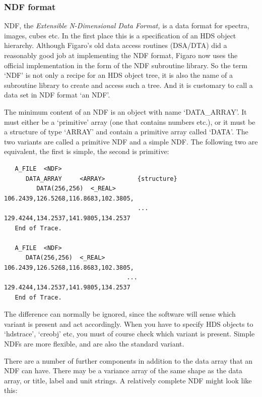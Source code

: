 
\subsubsection{\label{filesndf}NDF format}

   NDF, the
{\em Extensible N-Dimensional Data Format,\/}
   is a data format for spectra, images, cubes etc. In the first place
   this is a specification of an HDS object hierarchy. Although
   Figaro's old data access routines (DSA/DTA) did a reasonably good
   job at implementing the NDF format, Figaro now uses the official
   implementation in the form of the NDF subroutine library.
   So the term `NDF' is not only a recipe for an HDS object tree, it
   is also the name of a subroutine library to create and access such
   a tree. And it is customary to call a data set in NDF format `an
   NDF'.

   The minimum content of an NDF is an object with name
   `DATA\_ARRAY'. It must either be a `primitive' array (one that
   contains numbers etc.), or it must be a structure of type `ARRAY' and
   contain a primitive array called `DATA'. The two variants are
   called a primitive NDF and a simple NDF. The following two are
   equivalent, the first is simple, the second is primitive:

\begin{verbatim}
   A_FILE  <NDF>
      DATA_ARRAY     <ARRAY>         {structure}
         DATA(256,256)  <_REAL>         106.2439,126.5268,116.8683,102.3805,
                                     ... 129.4244,134.2537,141.9805,134.2537
   End of Trace.

   A_FILE  <NDF>
      DATA(256,256)  <_REAL>         106.2439,126.5268,116.8683,102.3805,
                                  ... 129.4244,134.2537,141.9805,134.2537
   End of Trace.
\end{verbatim}

   The difference can normally be ignored, since the software will sense
   which variant is present and act accordingly.  When you have to
   specify HDS objects to `hdstrace', `creobj' etc, you must of course
   check which variant is present.  Simple NDFs are more flexible, and
   are also the standard variant.

   There are a number of further components in addition to the data
   array that an NDF can have. There may be a variance array of the same
   shape as the data array, or title, label and unit strings. A
   relatively complete NDF might look like this:

